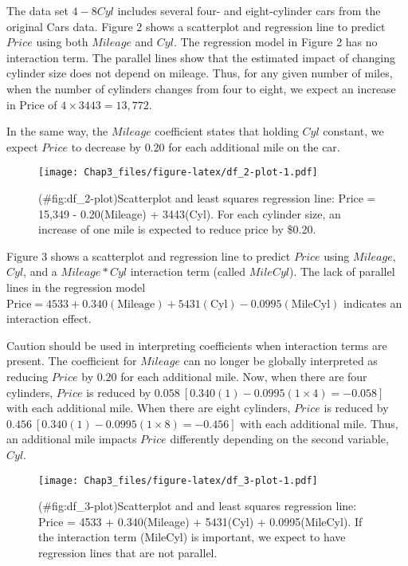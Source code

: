 \documentclass[
]{report}
\theoremstyle{definition}
\theoremstyle{definition}
\theoremstyle{definition}
\theoremstyle{definition}
\theoremstyle{remark}
\begin{document}
The data set \(4-8Cyl\) includes several four- and eight-cylinder cars from the original Cars data. Figure 2 shows a scatterplot and regression line to predict \(Price\) using both \(Mileage\) and \(Cyl\). The regression model in Figure 2 has no interaction term. The parallel lines show that the estimated impact of changing cylinder size does not depend on mileage. Thus, for any given number of miles, when the number of cylinders changes from four to eight, we expect an increase in Price of \(4 \times 3443 = 13{,}772\).

In the same way, the \(Mileage\) coefficient states that holding \(Cyl\) constant, we expect \(Price\) to decrease by \(0.20\) for each additional mile on the car.

\begin{figure}
\centering
\texttt{[image: Chap3\_files/figure-latex/df\_2-plot-1.pdf]}
\caption{(\#fig:df\_2-plot)Scatterplot and least squares regression line: Price = 15,349 - 0.20(Mileage) + 3443(Cyl). For each cylinder size, an increase of one mile is expected to reduce price by \$0.20.}
\end{figure}

Figure 3 shows a scatterplot and regression line to predict \(Price\) using \(Mileage\), \(Cyl\), and a \(Mileage*Cyl\) interaction term (called \(MileCyl\)). The lack of parallel lines in the regression model \(\text{Price} = 4533 + 0.340(\text{Mileage}) + 5431(\text{Cyl}) - 0.0995(\text{MileCyl})\) indicates an interaction effect.

Caution should be used in interpreting coefficients when interaction terms are present. The coefficient for \(Mileage\) can no longer be globally interpreted as reducing \(Price\) by \(0.20\) for each additional mile. Now, when there are four cylinders, \(Price\) is reduced by \(0.058\ [0.340(1) - 0.0995(1 \times 4) = -0.058]\) with each additional mile. When there are eight cylinders, \(Price\) is reduced by \(0.456\ [0.340(1) - 0.0995(1 \times 8) = -0.456]\) with each additional mile. Thus, an additional mile impacts \(Price\) differently depending on the second variable, \(Cyl\).

\begin{figure}
\centering
\texttt{[image: Chap3\_files/figure-latex/df\_3-plot-1.pdf]}
\caption{(\#fig:df\_3-plot)Scatterplot and and least squares regression line: Price = 4533 + 0.340(Mileage) + 5431(Cyl) + 0.0995(MileCyl). If the interaction term (MileCyl) is important, we expect to have regression lines that are not parallel.}
\end{figure}
\end{document}

